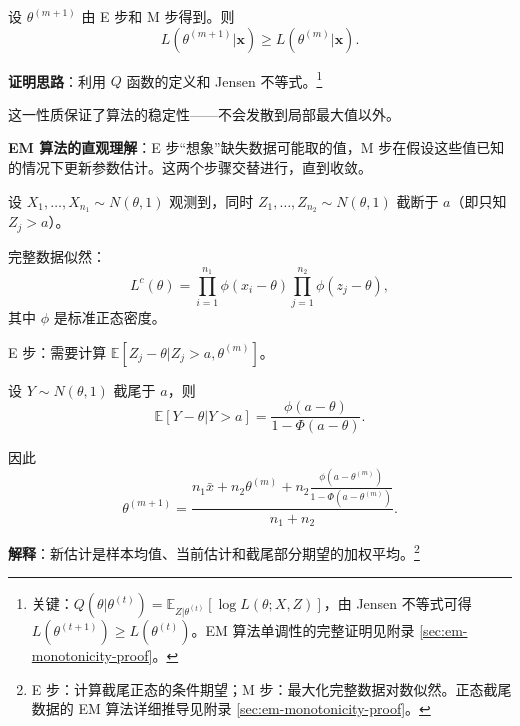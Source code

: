 
\begin{theorem}[EM 算法的单调性]\label{th:em-monotonicity}
设 $\theta^{(m+1)}$ 由 E 步和 M 步得到。则
\[
L(\theta^{(m+1)}|\mathbf{x}) \geq L(\theta^{(m)}|\mathbf{x}).
\label{eq:em-monotonicity}
\]
\end{theorem}

\textbf{证明思路}：利用 $Q$ 函数的定义和 Jensen 不等式。\footnote{关键：$Q(\theta|\theta^{(t)}) = \mathbb{E}_{Z|\theta^{(t)}}[\log L(\theta;X,Z)]$，由 Jensen 不等式可得 $L(\theta^{(t+1)}) \geq L(\theta^{(t)})$。EM 算法单调性的完整证明见附录 \cref{sec:em-monotonicity-proof}。}

这一性质保证了算法的稳定性——不会发散到局部最大值以外。

\begin{remark}
\textbf{EM 算法的直观理解}：E 步``想象''缺失数据可能取的值，M 步在假设这些值已知的情况下更新参数估计。这两个步骤交替进行，直到收敛。
\end{remark}

\begin{example}\label{ex:em-normal-missing}
设 $X_1, \ldots, X_{n_1} \sim N(\theta, 1)$ 观测到，同时 $Z_1, \ldots, Z_{n_2} \sim N(\theta, 1)$ 截断于 $a$（即只知 $Z_j > a$）。

完整数据似然：
\[
L^c(\theta) = \prod_{i=1}^{n_1} \phi(x_i - \theta) \prod_{j=1}^{n_2} \phi(z_j - \theta),
\]
其中 $\phi$ 是标准正态密度。

E 步：需要计算 $\mathbb{E}[Z_j - \theta | Z_j > a, \theta^{(m)}]$。

设 $Y \sim N(\theta, 1)$ 截尾于 $a$，则
\[
\mathbb{E}[Y - \theta | Y > a] = \frac{\phi(a-\theta)}{1-\Phi(a-\theta)}.
\]

因此
\[
\theta^{(m+1)} = \frac{n_1\bar{x} + n_2\theta^{(m)} + n_2\frac{\phi(a-\theta^{(m)})}{1-\Phi(a-\theta^{(m)})}}{n_1+n_2}.
\label{eq:em-normal-missing-update}
\]

\textbf{解释}：新估计是样本均值、当前估计和截尾部分期望的加权平均。\footnote{E 步：计算截尾正态的条件期望；M 步：最大化完整数据对数似然。正态截尾数据的 EM 算法详细推导见附录 \cref{sec:em-monotonicity-proof}。}
\end{example}

